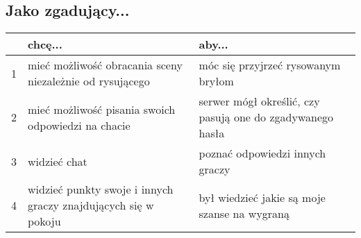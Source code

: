 \subsection{Jako zgadujący...}
\begin{center}
    \begin{tabular}{ | l || p{6cm} | p{6cm} |}
    \hline
     & \textbf{chcę...} & \textbf{aby...} \\ \hline \hline
    1 & mieć możliwość obracania sceny niezależnie od rysującego & móc się przyjrzeć rysowanym bryłom \\ \hline
    2 & mieć możliwość pisania swoich odpowiedzi na chacie & serwer mógł określić, czy pasują one do zgadywanego hasła \\ \hline
    3 & widzieć chat & poznać odpowiedzi innych graczy \\ \hline
    4 & widzieć punkty swoje i innych graczy znajdujących się w pokoju & był wiedzieć jakie są moje szanse na wygraną \\ \hline
    \end{tabular}
\end{center}